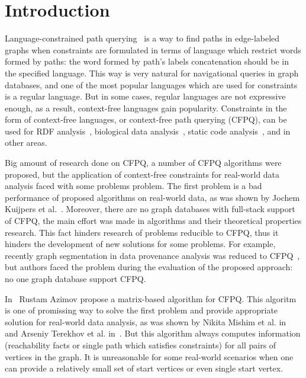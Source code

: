 \section{Introduction}

Language-constrained path querying~\cite{doi:10.1137/S0097539798337716} is a way to find paths in edge-labeled graphs when constraints are formulated in terms of language which restrict words formed by paths: the word formed by path's labels concatenation should be in the specified language.
This way is very natural for navigational queries in graph databases, and one of the most popular languages which are used for constraints is a regular language. 
But in some cases, regular languages are not expressive enough, as a result, context-free languages gain popularity.
Constraints in the form of context-free languages, or context-free path querying (CFPQ), can be used for RDF analysis~\cite{10.1007/978-3-319-46523-4_38}, biological data analysis~\cite{SubgraphQueriesbyContextfreeGrammars}, static code analysis~\cite{Zheng,10.1145/373243.360208}, and in other areas.

Big amount of research done on CFPQ, a number of CFPQ algorithms were proposed, but the application of context-free constraints for real-world data analysis faced with some problems problem.
The first problem is a bad performance of proposed algorithms on real-world data, as was shown by Jochem Kuijpers et al.~\cite{Kuijpers:2019:ESC:3335783.3335791}.
Moreover, there are no graph databases with full-stack support of CFPQ, the main effort was made in algorithms and their theoretical properties research.
This fact hinders research of problems reducible to CFPQ, thus it hinders the development of new solutions for some problems.
For example, recently graph segmentation in data provenance analysis was reduced to CFPQ~\cite{!!!}, but authors faced the problem during the evaluation of the proposed approach: no one graph database support CFPQ.

In~\cite{Azimov:2018:CPQ:3210259.3210264} Rustam Azimov propose a matrix-based algorithm for CFPQ.
This algoritm is one of promissing way to solve the first problem and provide appropriate solution for real-world data analysis, as was shown by Nikita Mishim et al. in~\cite{Mishin:2019:ECP:3327964.3328503} and Arseniy Terekhov et al. in~\cite{10.1145/3398682.3399163}. 
But this algorithm always computes information (reachability facts or single path which satisfies constraints) for all pairs of vertices in the graph.
It is unreasonable for some real-world scenarios when one can provide a relatively small set of start vertices or even single start vertex. 

